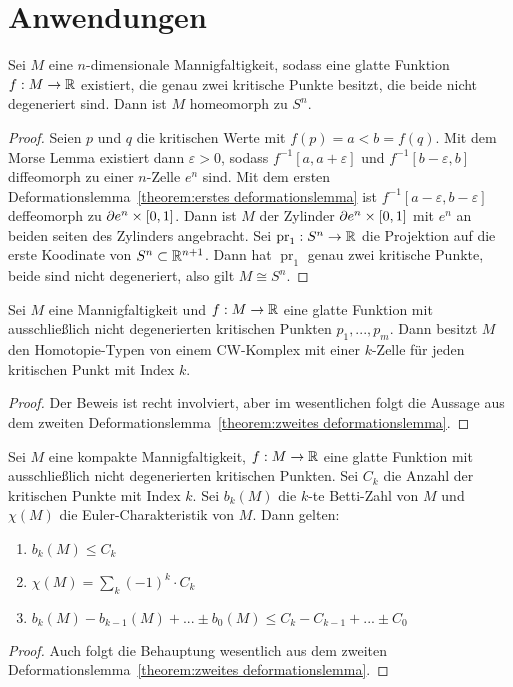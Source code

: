 \section{Anwendungen}

\begin{theorem}
    \label{theorem:Sn}
    Sei $M$ eine $n$-dimensionale Mannigfaltigkeit, sodass eine glatte Funktion
    $f: M \to { \mathbb R }$ existiert, die genau zwei kritische Punkte besitzt, die beide
    nicht degeneriert sind. Dann ist $M$ homeomorph zu $S^n$.
\end{theorem}

\begin{proof}
    Seien $p$ und $q$ die kritischen Werte mit $f(p) = a < b = f(q)$. Mit dem 
    Morse Lemma existiert dann $\varepsilon > 0$, sodass 
    $f^{-1}[a, a + \varepsilon]$ und $f^{-1}[b - \varepsilon, b]$ diffeomorph
    zu einer $n$-Zelle $e^n$ sind. 
    Mit dem ersten Deformationslemma~\ref{theorem:erstes deformationslemma} ist
    $f^{-1}[a - \varepsilon, b - \varepsilon]$ deffeomorph zu 
    ${ \partial } e^n \times [0, 1]$. Dann ist $M$ der Zylinder ${ \partial } e^n \times [0, 1]$ 
    mit $e^n$ an beiden seiten des Zylinders angebracht. Sei 
    $\operatorname{pr}_1: S^n \to { \mathbb R }$ die Projektion auf die erste Koodinate von
    $S^n \subset { \mathbb R }^{n + 1}$. Dann hat $\operatorname{pr}_1$ genau zwei kritische 
    Punkte, beide sind nicht degeneriert, also gilt $M \cong S^n$.
\end{proof}

\begin{theorem}
    \label{theorem:CW-komplex}
    Sei $M$ eine Mannigfaltigkeit und $f: M \to { \mathbb R }$ eine glatte Funktion mit 
    ausschließlich nicht degenerierten kritischen Punkten $p_1, ..., p_m$. 
    Dann besitzt $M$ den Homotopie-Typen von einem CW-Komplex mit einer $k$-Zelle 
    für jeden kritischen Punkt mit Index $k$.
\end{theorem}

\begin{proof}
    Der Beweis ist recht involviert, aber im wesentlichen folgt die Aussage aus
    dem zweiten Deformationslemma~\ref{theorem:zweites deformationslemma}.
\end{proof}

\begin{theorem}
    Sei $M$ eine kompakte Mannigfaltigkeit, $f: M \to { \mathbb R }$ eine glatte Funktion
    mit ausschließlich nicht degenerierten kritischen Punkten. Sei $C_k$ die
    Anzahl der kritischen Punkte mit Index $k$. Sei $b_k(M)$ die $k$-te 
    Betti-Zahl von $M$ und $\chi(M)$ die Euler-Charakteristik von $M$. 
    Dann gelten:
    \begin{enumerate}
        \item $ b_k(M) \leq C_k $ 
        \item $ \chi(M) = \sum_k (-1)^k \cdot C_k $
        \item $ b_k(M) - b_{k - 1}(M) + ... \pm b_0(M) 
            \leq C_k - C_{k-1} + ... \pm C_0 $
    \end{enumerate}
\end{theorem}

\begin{proof}
    Auch folgt die Behauptung wesentlich aus dem zweiten 
    Deformationslemma~\ref{theorem:zweites deformationslemma}. 
\end{proof}
